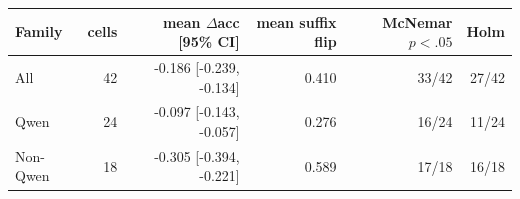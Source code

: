\begin{tabular}{lrrrrr}
\toprule
Family & cells & mean $\Delta$acc [95\% CI] & mean suffix flip & McNemar $p<.05$ & Holm \\
\midrule
All & 42 & -0.186 [-0.239, -0.134] & 0.410 & 33/42 & 27/42 \\
Qwen & 24 & -0.097 [-0.143, -0.057] & 0.276 & 16/24 & 11/24 \\
Non-Qwen & 18 & -0.305 [-0.394, -0.221] & 0.589 & 17/18 & 16/18 \\
\bottomrule
\end{tabular}
